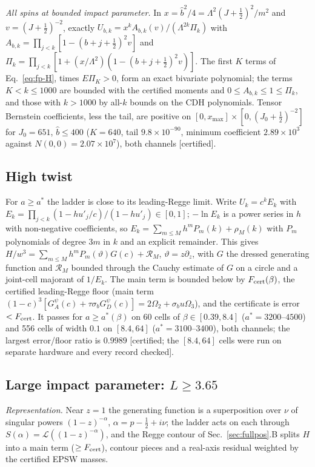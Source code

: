 \emph{All spins at bounded impact parameter.} In $x=\hat b^2/4=\Lambda^2(J+\frac12)^2/m^2$ and $v=(J+\frac12)^{-2}$, exactly
$U_{b,k}=x^kA_{b,k}(v)/(\Lambda^{2k}\Pi_k)$ with $A_{b,k}=\prod_{j<k}[1-(b+j+\frac12)^2v]$ and
$\Pi_k=\prod_{j<k}[1+(x/\Lambda^2)(1-(b+j+\frac12)^2v)]$. The first $K$ terms of Eq.~\eqref{eq:fp-H}, times $E\Pi_K>0$, form an exact
bivariate polynomial; the terms $K<k\le1000$ are bounded with the certified moments and $0\le A_{b,k}\le1\le\Pi_k$, and those with
$k>1000$ by all-$k$ bounds on the CDH polynomials. Tensor Bernstein coefficients, less the tail, are positive on
$[0,x_{\max}]\times[0,(J_0+\frac12)^{-2}]$ for $J_0=651$, $\hat b\le400$ ($K=640$, tail $9.8\times10^{-90}$, minimum coefficient
$2.89\times10^3$ against $N(0,0)=2.07\times10^7$), both channels [certified].

\subsection{High twist}
For $a\ge a^*$ the ladder is close to its leading-Regge limit. Write $U_k=c^kE_k$ with $E_k=\prod_{j<k}(1-hu'_j/c)/(1-hu'_j)\in[0,1]$;
$-\ln E_k$ is a power series in $h$ with non-negative coefficients, so $E_k=\sum_{m\le M}h^mP_m(k)+\rho_M(k)$ with $P_m$ polynomials of
degree $3m$ in $k$ and an explicit remainder. This gives
$H/w^3=\sum_{m\le M}h^mP_m(\vartheta)G(c)+\mathcal R_M$, $\vartheta=z\partial_z$, with $G$ the dressed generating function and
$\mathcal R_M$ bounded through the Cauchy estimate of $G$ on a circle and a joint-cell majorant of $1/E_k$. The main term is bounded below
by $F_{\rm cert}(\beta)$, the certified leading-Regge floor (main term $(1-c)^3[G_A^\psi(c)+\tau\sigma_bG_D^\psi(c)]=2\Omega_2+\sigma_bu\Omega_3$),
and the certificate is error $<F_{\rm cert}$. It passes for $a\ge a^*(\beta)$ on 60 cells of $\beta\in[0.39,8.4]$ ($a^*=3200$--$4500$) and
556 cells of width $0.1$ on $[8.4,64]$ ($a^*=3100$--$3400$), both channels; the largest error/floor ratio is $0.9989$ [certified;
the $[8.4,64]$ cells were run on separate hardware and every record checked].

\subsection{Large impact parameter: \texorpdfstring{$L\ge3.65$}{L >= 3.65}}
\emph{Representation.} Near $z=1$ the generating function is a superposition over $\nu$ of singular powers $(1-z)^{-\alpha}$,
$\alpha=p-\frac12+i\nu$; the ladder acts on each through $S(\alpha)=\mathcal L((1-z)^{-\alpha})$, and the Regge contour of
Sec.~\ref{sec:fullpos}.B splits $H$ into a main term ($\ge F_{\rm cert}$), contour pieces and a real-axis residual weighted by the
certified EPSW masses.

